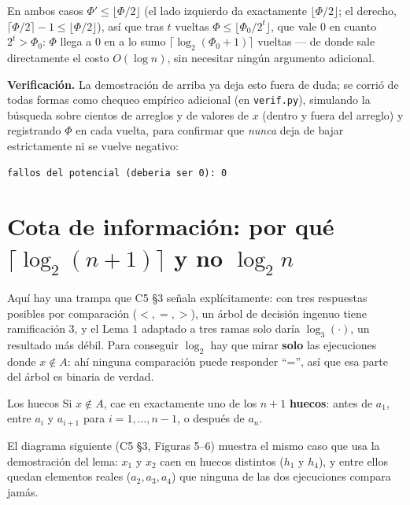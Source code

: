 \documentclass[11pt]{article}
\begin{document}
En ambos casos $\Phi'\le\lfloor\Phi/2\rfloor$ (el lado izquierdo da exactamente $\lfloor\Phi/2\rfloor$; el
derecho, $\lceil\Phi/2\rceil-1\le\lfloor\Phi/2\rfloor$), así que tras $t$ vueltas $\Phi\le\lfloor\Phi_0/2^t\rfloor$,
que vale 0 en cuanto $2^t>\Phi_0$: $\Phi$ llega a 0 en a lo sumo $\lceil\log_2(\Phi_0{+}1)\rceil$ vueltas --- de
donde sale directamente el costo $O(\log n)$, sin necesitar ningún argumento adicional.

\textbf{Verificación.} La demostración de arriba ya deja esto fuera de duda; se corrió de todas formas como
chequeo empírico adicional (en \texttt{verif.py}), simulando la búsqueda sobre cientos de arreglos y de
valores de $x$ (dentro y fuera del arreglo) y registrando $\Phi$ en cada vuelta, para confirmar que
\emph{nunca} deja de bajar estrictamente ni se vuelve negativo:

\begin{lstlisting}[style=salida]
fallos del potencial (deberia ser 0): 0
\end{lstlisting}

\section{Cota de información: por qué \texorpdfstring{$\lceil\log_2(n{+}1)\rceil$}{ceil(log2(n+1))} y no \texorpdfstring{$\log_2 n$}{log2 n}}

Aquí hay una trampa que C5 §3 señala explícitamente: con tres respuestas posibles por comparación
($<,=,>$), un árbol de decisión ingenuo tiene ramificación 3, y el Lema 1 adaptado a tres ramas solo daría
$\log_3(\cdot)$, un resultado más débil. Para conseguir $\log_2$ hay que mirar \textbf{solo} las ejecuciones
donde $x\notin A$: ahí ninguna comparación puede responder ``='', así que esa parte del árbol es binaria de
verdad.

\begin{resultado}{Los huecos}
Si $x\notin A$, cae en exactamente uno de los $n{+}1$ \textbf{huecos}: antes de $a_1$, entre $a_i$ y
$a_{i+1}$ para $i=1,\dots,n{-}1$, o después de $a_n$.
\end{resultado}

El diagrama siguiente (C5 §3, Figuras 5--6) muestra el mismo caso que usa la demostración del lema: $x_1$ y
$x_2$ caen en huecos distintos ($h_1$ y $h_4$), y entre ellos quedan elementos reales ($a_2,a_3,a_4$) que
ninguna de las dos ejecuciones compara jamás.
\end{document}
